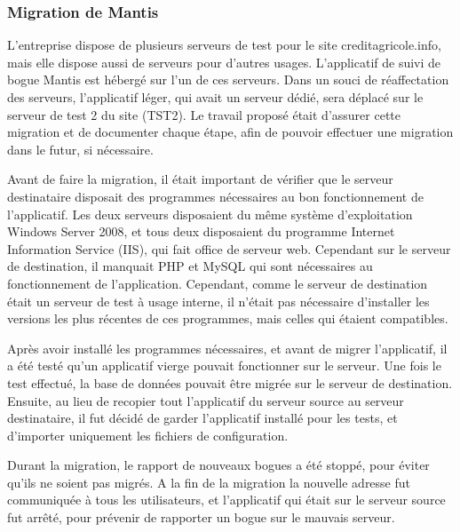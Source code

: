 \documentclass[12pt,a4paper]{article}
\begin{document}
\subsubsection{Migration de Mantis}
L'entreprise dispose de plusieurs serveurs de test pour le site creditagricole.info, mais elle dispose aussi de serveurs pour d'autres usages. L'applicatif de suivi de bogue Mantis est hébergé sur l'un de ces serveurs. Dans un souci de réaffectation des serveurs, l'applicatif léger, qui avait un serveur dédié, sera déplacé sur le serveur de test 2 du site (TST2). Le travail proposé était d'assurer cette migration et de documenter chaque étape, afin de pouvoir effectuer une migration dans le futur, si nécessaire.\par 
Avant de faire la migration, il était important de vérifier que le serveur destinataire disposait des programmes nécessaires au bon fonctionnement de l'applicatif. Les deux serveurs disposaient du même système d'exploitation Windows Server 2008, et tous deux disposaient du programme Internet Information Service (IIS), qui fait office de serveur web. Cependant sur le serveur de destination, il manquait \gls{PHP} et MySQL qui sont nécessaires au fonctionnement de l'application. Cependant, comme le serveur de destination était un serveur de test à usage interne, il n'était pas nécessaire d'installer les versions les plus récentes de ces programmes, mais celles qui étaient compatibles.\par 
Après avoir installé les programmes nécessaires, et avant de migrer l'applicatif, il a été testé qu'un applicatif vierge pouvait fonctionner sur le serveur. Une fois le test effectué, la base de données pouvait être migrée sur le serveur de destination. Ensuite, au lieu de recopier tout l'applicatif du serveur source au serveur destinataire, il fut décidé de garder l'applicatif installé pour les tests, et d'importer uniquement les fichiers de configuration.\par 
Durant la migration, le rapport de nouveaux bogues a été stoppé, pour éviter qu'ils ne soient pas migrés. A la fin de la migration la nouvelle adresse fut communiquée à tous les utilisateurs, et l'applicatif qui était sur le serveur source fut arrêté, pour prévenir de rapporter un bogue sur le mauvais serveur.\par

\newpage
\end{document}
